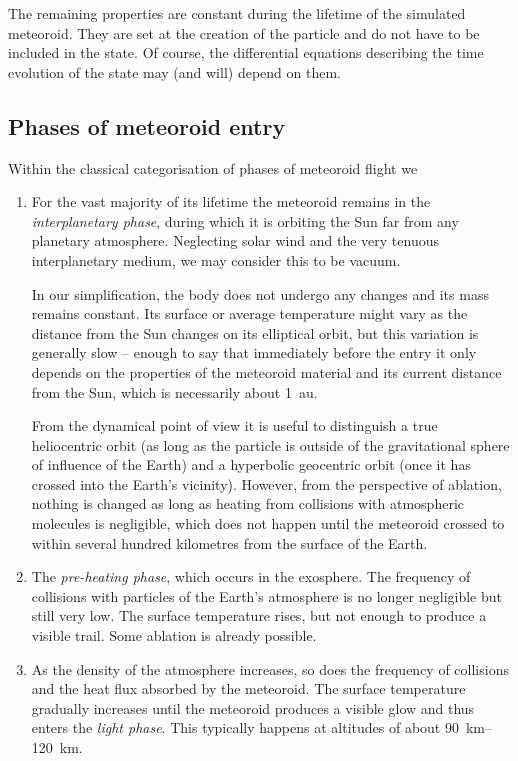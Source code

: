     The remaining properties are constant during the lifetime of the simulated meteoroid.
    They are set at the creation of the particle and do not have to be included in the state.
    Of course, the differential equations describing the time evolution of the state
    may (and will) depend on them.

    \subsection{Phases of meteoroid entry} \label{dap}
        Within the classical categorisation of phases of meteoroid flight \citep{???}
        we 

        \begin{enumerate}
            \item For the vast majority of its lifetime the meteoroid remains in
                the \emph{interplanetary phase}, during which it is orbiting the Sun
                far from any planetary atmosphere. Neglecting solar wind and
                the very tenuous interplanetary medium, we may consider this to be vacuum.

                In our simplification, the body does not undergo any changes and its mass remains constant.
                Its surface or average temperature might vary as the distance from
                the Sun changes on its elliptical orbit, but this variation
                is generally slow -- enough to say that immediately before the entry it only
                depends on the properties of the meteoroid material and its current distance from the Sun,
                which is necessarily about \SI{1}{au}.

                From the dynamical point of view it is useful to distinguish a true heliocentric orbit
                (as long as the particle is outside of the gravitational sphere of influence of the Earth)
                and a hyperbolic geocentric orbit (once it has crossed into the Earth's vicinity).
                However, from the perspective of ablation, nothing is changed
                as long as heating from collisions with atmospheric molecules is negligible,
                which does not happen until the meteoroid crossed to within several hundred
                kilometres from the surface of the Earth.
            \item The \emph{pre-heating phase}, which occurs in the exosphere.
                The frequency of collisions with particles of the Earth's atmosphere
                is no longer negligible but still very low. The surface temperature rises,
                but not enough to produce a visible trail. Some ablation is already possible.
            \item As the density of the atmosphere increases, so does the frequency of collisions
                and the heat flux absorbed by the meteoroid. The surface temperature gradually increases
                until the meteoroid produces a visible glow and thus enters the \emph{light phase}.
                This typically happens at altitudes of about \SIrange{90}{120}{\kilo\metre}.


\end{enumerate}
